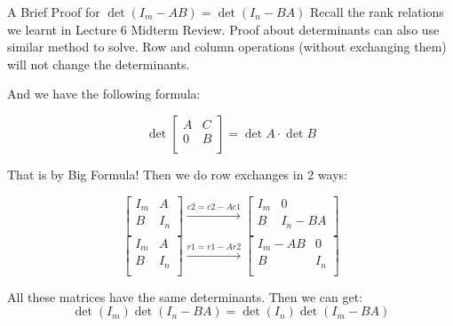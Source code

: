 \documentclass{beamer}
\begin{document}
\begin{frame}{A Brief Proof for $\det(I_m-AB)=\det(I_n-BA)$}
Recall the rank relations we learnt in Lecture 6 Midterm Review. Proof about determinants can also use similar method to solve. Row and column operations (without exchanging them) will not change the determinants.

\vspace{3pt}
And we have the following formula:

\begin{equation*}
    \det \left[ \begin{matrix}
        A&		C\\
        0&		B\\
    \end{matrix} \right] =\det A\cdot \det B
\end{equation*}

That is by Big Formula! Then we do row exchanges in 2 ways:

\begin{equation*}
    \left[ \begin{matrix}
        I_m&		A\\
        B&		I_n\\
    \end{matrix} \right] \xrightarrow{c2=c2-Ac1}\left[ \begin{matrix}
        I_m&		0\\
        B&		I_n-BA\\
    \end{matrix} \right]
\end{equation*}
\begin{equation*}
    \left[ \begin{matrix}
        I_m&		A\\
        B&		I_n\\
    \end{matrix} \right] \xrightarrow{r1=r1-Ar2}\left[ \begin{matrix}
        I_m-AB&		0\\
        B&		I_n\\
    \end{matrix} \right]
\end{equation*}

All these matrices have the same determinants. Then we can get:
\begin{equation*}
    \det \left( I_m \right) \det \left( I_n-BA \right) =\det \left( I_n \right) \det \left( I_m-BA \right)
\end{equation*}
\end{frame}
\end{document}
